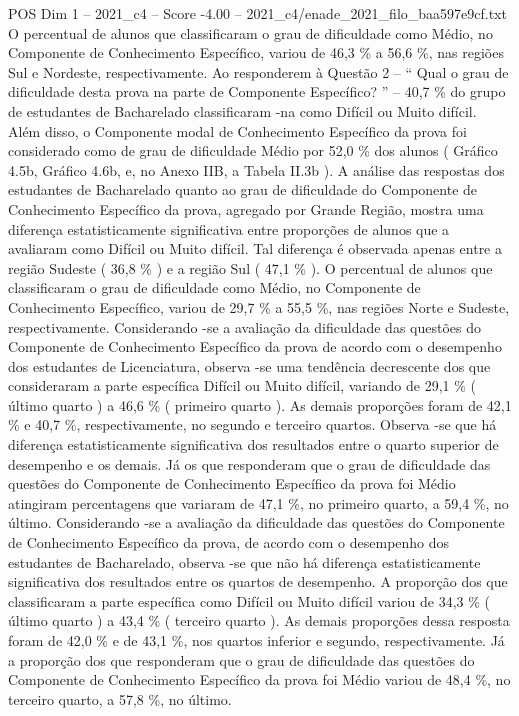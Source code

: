 \begin{textsample}{POS Dim 1 – 2021\_c4 – Score -4.00 – 2021\_c4/enade\_2021\_filo\_baa597e9cf.txt}
O percentual de alunos que classificaram o grau de dificuldade como Médio, no Componente de Conhecimento Específico, variou de 46,3 \% a 56,6 \%, nas regiões Sul e Nordeste, respectivamente.
Ao responderem à Questão 2 – “ Qual o grau de dificuldade desta prova na parte de Componente Específico? ” – 40,7 \% do grupo de estudantes de Bacharelado classificaram -na como Difícil ou Muito difícil.
Além disso, o Componente modal de Conhecimento Específico da prova foi considerado como de grau de dificuldade Médio por 52,0 \% dos alunos ( Gráfico 4.5b, Gráfico 4.6b, e, no Anexo IIB, a Tabela II.3b ).
A análise das respostas dos estudantes de Bacharelado quanto ao grau de dificuldade do Componente de Conhecimento Específico da prova, agregado por Grande Região, mostra uma diferença estatisticamente significativa entre proporções de alunos que a avaliaram como Difícil ou Muito difícil.
Tal diferença é observada apenas entre a região Sudeste ( 36,8 \% ) e a região Sul ( 47,1 \% ).
O percentual de alunos que classificaram o grau de dificuldade como Médio, no Componente de Conhecimento Específico, variou de 29,7 \% a 55,5 \%, nas regiões Norte e Sudeste, respectivamente.
Considerando -se a avaliação da dificuldade das questões do Componente de Conhecimento Específico da prova de acordo com o desempenho dos estudantes de Licenciatura, observa -se uma tendência decrescente dos que consideraram a parte específica Difícil ou Muito difícil, variando de 29,1 \% ( último quarto ) a 46,6 \% ( primeiro quarto ).
As demais proporções foram de 42,1 \% e 40,7 \%, respectivamente, no segundo e terceiro quartos.
Observa -se que há diferença estatisticamente significativa dos resultados entre o quarto superior de desempenho e os demais.
Já os que responderam que o grau de dificuldade das questões do Componente de Conhecimento Específico da prova foi Médio atingiram percentagens que variaram de 47,1 \%, no primeiro quarto, a 59,4 \%, no último.
Considerando -se a avaliação da dificuldade das questões do Componente de Conhecimento Específico da prova, de acordo com o desempenho dos estudantes de Bacharelado, observa -se que não há diferença estatisticamente significativa dos resultados entre os quartos de desempenho.
A proporção dos que classificaram a parte específica como Difícil ou Muito difícil variou de 34,3 \% ( último quarto ) a 43,4 \% ( terceiro quarto ).
As demais proporções dessa resposta foram de 42,0 \% e de 43,1 \%, nos quartos inferior e segundo, respectivamente.
Já a proporção dos que responderam que o grau de dificuldade das questões do Componente de Conhecimento Específico da prova foi Médio variou de 48,4 \%, no terceiro quarto, a 57,8 \%, no último.

\end{textsample}
